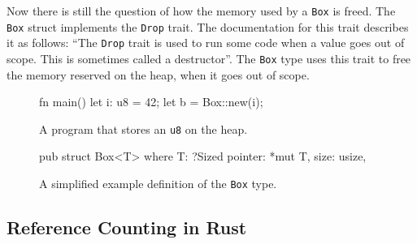 \documentclass[twocolumn]{article}
\begin{document}
Now there is still the question of how the memory used by a \texttt{Box} is freed.
The \texttt{Box} struct implements the \texttt{Drop} trait.
The documentation for this trait describes it as follows: ``The \texttt{Drop} trait is used to run some code when a value goes out of scope. This is sometimes called a destructor''\cite{RustDoc-Drop}.
The \texttt{Box} type uses this trait to free the memory reserved on the heap, when it goes out of scope.


\begin{figure}
\begin{rustcode}
fn main() {
    let i: u8 = 42;
    let b = Box::new(i);
}
\end{rustcode}
\vspace{-2em}
\caption{A program that stores an \texttt{u8} on the heap.}
\label{box-example}
\end{figure}
\begin{figure}
\begin{rustcode}
pub struct Box<T> where T: ?Sized {
    pointer: *mut T,
    size: usize,
}
\end{rustcode}
\vspace{-2em}
\caption{A simplified example definition of the \texttt{Box} type.}
\label{box-definition}
\end{figure}
\subsection{Reference Counting in Rust}
\end{document}
